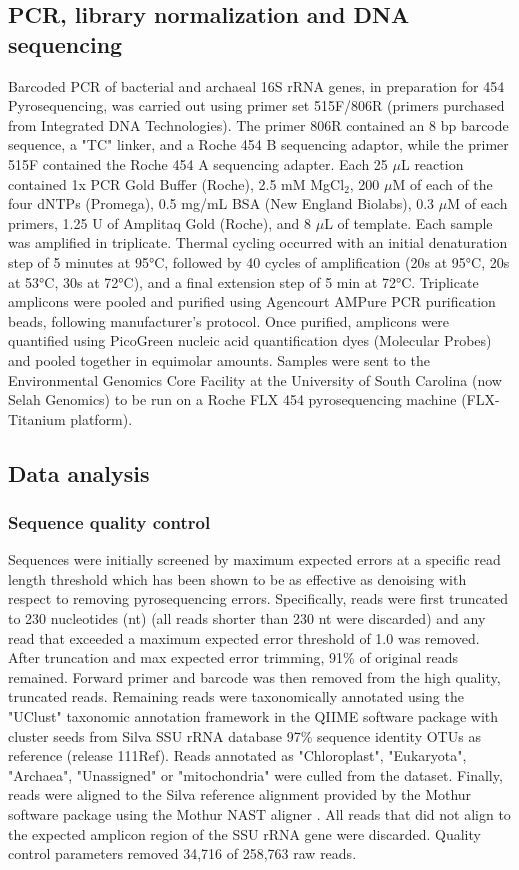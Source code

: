  \subsection{PCR, library normalization and DNA sequencing} 
 Barcoded PCR of bacterial and archaeal 16S
 rRNA genes, in preparation for 454 Pyrosequencing, was carried out using
 primer set 515F/806R \citep{21349862} (primers purchased from Integrated DNA
 Technologies).  The primer 806R contained an 8 bp
 barcode sequence, a "TC" linker, and a Roche 454 B sequencing adaptor, while
 the primer 515F contained the Roche 454 A sequencing adapter. Each 25 $\mu$L
 reaction contained 1x PCR Gold Buffer (Roche), 2.5 mM MgCl$_{2}$, 200 $\mu$M
 of each of the four dNTPs (Promega), 0.5 mg/mL BSA (New England Biolabs), 0.3
 $\mu$M of each primers, 1.25 U of Amplitaq Gold (Roche), and 8 $\mu$L of
 template. Each sample was amplified in triplicate. Thermal cycling occurred
 with an initial denaturation step of 5 minutes at 95°C, followed by 40 cycles
 of amplification (20s at 95°C, 20s at 53°C, 30s at 72°C), and a final
 extension step of 5 min at 72°C. Triplicate amplicons were pooled and purified
 using Agencourt AMPure PCR purification beads, following manufacturer’s
 protocol. Once purified, amplicons were quantified using PicoGreen nucleic acid
 quantification dyes (Molecular Probes) and pooled together in equimolar
 amounts. Samples were sent to the Environmental Genomics Core Facility at the
 University of South Carolina (now Selah Genomics) to be run on a Roche FLX 454
 pyrosequencing machine (FLX-Titanium platform). 

\subsection{Data analysis} 
\subsubsection{Sequence quality control}
Sequences were initially screened by maximum expected errors at a specific read
length threshold \citep{23955772} which has been shown to be as effective as
denoising with respect to removing pyrosequencing errors. Specifically, reads
were first truncated to 230 nucleotides (nt) (all reads shorter than 230 nt
were discarded) and any read that exceeded a maximum expected error threshold
of 1.0 was removed. After truncation and max expected error trimming, 91\% of
original reads remained.  Forward primer and barcode was then removed from the
high quality, truncated reads.  Remaining reads were taxonomically annotated
using the "UClust" taxonomic annotation framework in the QIIME software package
\citep{20383131, 20709691} with cluster seeds from Silva SSU rRNA database
\citep{17947321} 97\% sequence identity OTUs as reference (release 111Ref).
Reads annotated as "Chloroplast", "Eukaryota", "Archaea", "Unassigned" or
"mitochondria" were culled from the dataset. Finally, reads were aligned to the
Silva reference alignment provided by the Mothur software package
\citep{19801464} using the Mothur NAST aligner \citep{16845035}. All reads that
did not align to the expected amplicon region of the SSU rRNA gene were
discarded. Quality control parameters removed 34,716 of 258,763 raw reads.

